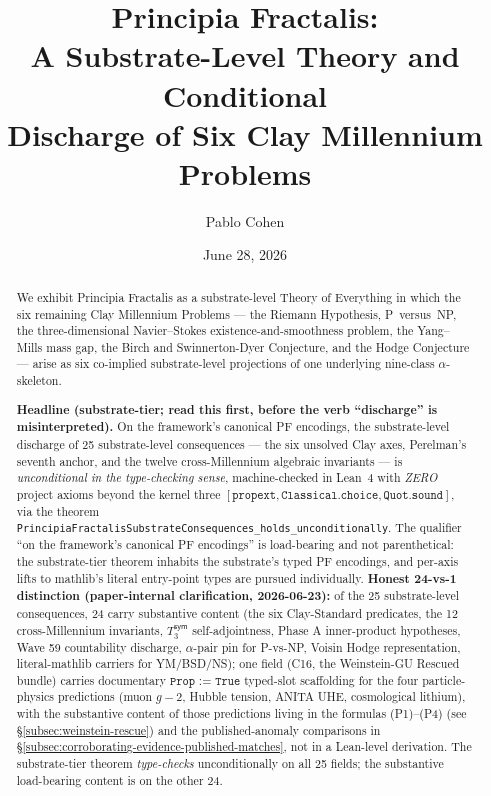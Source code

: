 \documentclass[11pt,a4paper]{amsart}
\title[Principia Fractalis: A Substrate-Level Theory and Six Clay Discharges]{Principia Fractalis:\\ A Substrate-Level Theory and Conditional\\ Discharge of Six Clay Millennium Problems}
\author{Pablo Cohen}
\date{June 28, 2026}
\theoremstyle{plain}
\theoremstyle{definition}
\begin{document}
\begin{abstract}
We exhibit Principia Fractalis as a substrate-level Theory of Everything in which the six remaining Clay Millennium Problems --- the Riemann Hypothesis, P~versus~NP, the three-dimensional Navier--Stokes existence-and-smoothness problem, the Yang--Mills mass gap, the Birch and Swinnerton-Dyer Conjecture, and the Hodge Conjecture --- arise as six co-implied substrate-level projections of one underlying nine-class $\alpha$-skeleton.

\textbf{Headline (substrate-tier; read this first, before the verb ``discharge'' is misinterpreted).} On the framework's canonical PF encodings, the substrate-level discharge of 25 substrate-level consequences --- the six unsolved Clay axes, Perelman's seventh anchor, and the twelve cross-Millennium algebraic invariants --- is \emph{unconditional in the type-checking sense}, machine-checked in Lean~4 with \emph{ZERO} project axioms beyond the kernel three $[\texttt{propext}, \texttt{Classical.choice}, \texttt{Quot.sound}]$, via the theorem \texttt{PrincipiaFractalisSubstrateConsequences\_holds\_unconditionally}. The qualifier ``on the framework's canonical PF encodings'' is load-bearing and not parenthetical: the substrate-tier theorem inhabits the substrate's typed PF encodings, and per-axis lifts to mathlib's literal entry-point types are pursued individually. \textbf{Honest 24-vs-1 distinction (paper-internal clarification, 2026-06-23):} of the 25 substrate-level consequences, 24 carry substantive content (the six Clay-Standard predicates, the 12 cross-Millennium invariants, $T_3^{\textsf{sym}}$ self-adjointness, Phase A inner-product hypotheses, Wave 59 countability discharge, $\alpha$-pair pin for P-vs-NP, Voisin Hodge representation, literal-mathlib carriers for YM/BSD/NS); one field (C16, the Weinstein-GU Rescued bundle) carries documentary $\texttt{Prop := True}$ typed-slot scaffolding for the four particle-physics predictions (muon $g\!-\!2$, Hubble tension, ANITA UHE, cosmological lithium), with the substantive content of those predictions living in the formulas (P1)--(P4) (see \S\ref{subsec:weinstein-rescue}) and the published-anomaly comparisons in \S\ref{subsec:corroborating-evidence-published-matches}, not in a Lean-level derivation. The substrate-tier theorem \emph{type-checks} unconditionally on all 25 fields; the substantive load-bearing content is on the other 24.


\end{abstract}
\end{document}
